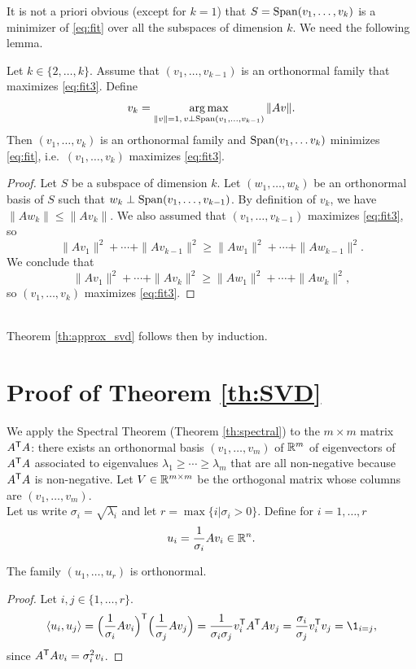 \documentclass[11pt,nocut]{article}
\begin{document}
It is not a priori obvious (except for $k=1$) that $S = {{\rm Span}}(v_1, \dots, v_k)$ is a minimizer of \eqref{eq:fit} over all the subspaces of dimension $k$.
We need the following lemma.

\begin{lemma}\label{lem:svd_rec}
	Let $k \in \{2, \dots, k\}$. Assume that $(v_1, \dots, v_{k-1})$ is an orthonormal family that maximizes \eqref{eq:fit3}.
	Define 
	$$
	v_k = \operatorname*{arg\,max}_{\|v\| = 1, \, v \perp {{\rm Span}}(v_1, \dots, v_{k-1})} \|Av\|.
	$$
	Then $(v_1, \dots, v_{k})$ is an orthonormal family and ${{\rm Span}}(v_1, \dots v_k)$ minimizes \eqref{eq:fit}, i.e.\ $(v_1, \dots, v_{k})$ maximizes \eqref{eq:fit3}.
\end{lemma}
\begin{proof}
	Let $S$ be a subspace of dimension $k$. Let $(w_1, \dots, w_k)$ be an orthonormal basis of $S$ such that $w_{k} \perp {{\rm Span}}(v_1, \dots, v_{k-1})$. By definition of $v_k$,
	we have $\|A w_k \| \leq \| A v_k\|$. 
	We also assumed that $(v_1, \dots, v_{k-1})$ maximizes \eqref{eq:fit3}, so
	$$
	\|A v_1\|^2 + \cdots + \| A v_{k-1} \|^2 \geq
	\|A w_1\|^2 + \cdots+ \| A w_{k-1} \|^2.
	$$
	We conclude that
	$$
	\|A v_1\|^2 + \cdots + \| A v_{k} \|^2 \geq
	\|A w_1\|^2 + \cdots + \| A w_{k} \|^2,
	$$
	so $(v_1, \dots, v_k)$ maximizes \eqref{eq:fit3}.
\end{proof}
\\

Theorem \ref{th:approx_svd} follows then by induction.

\section*{Proof of Theorem \ref{th:SVD}}
We apply the Spectral Theorem (Theorem \ref{th:spectral}) to the $m \times m$ matrix $A^{{\sf T}} A$: there exists an orthonormal basis $(v_1, \dots, v_m)$ of $\mathbb{R}^m$ of eigenvectors of $A^{{\sf T}} A$ associated to eigenvalues $\lambda_1 \geq \cdots \geq \lambda_m$ that are all non-negative because $A^{{\sf T}} A$ is non-negative.
Let $V \in \mathbb{R}^{m \times m}$ be the orthogonal matrix whose columns are $(v_1, \dots, v_m)$.
\\

Let us write $\sigma_i = \sqrt{\lambda_i}$ and let $r = \max\{ i | \sigma_i > 0\}$.
Define for $i = 1, \dots, r$
\begin{equation}\label{eq:def_u}
	u_i = \frac{1}{\sigma_i} A v_i \in \mathbb{R}^n.
\end{equation}
\begin{lemma}
	The family $(u_1, \dots, u_r)$ is orthonormal.
\end{lemma}
\begin{proof}
	Let $i,j \in \{1, \dots, r \}$.
	$$
	\langle u_i, u_j \rangle = \Big(\frac{1}{\sigma_i} A v_i\Big)^{\sT}\Big(\frac{1}{\sigma_j} A v_j\Big) = \frac{1}{\sigma_i \sigma_j} v_i^{\sT} A^{\sT} A v_j
	= \frac{\sigma_i}{\sigma_j} v_i^{\sT} v_j = \1_{i = j},
	$$
	since $A^{{\sf T}} A v_i = \sigma_i^2 v_i$.
\end{proof}
\end{document}
